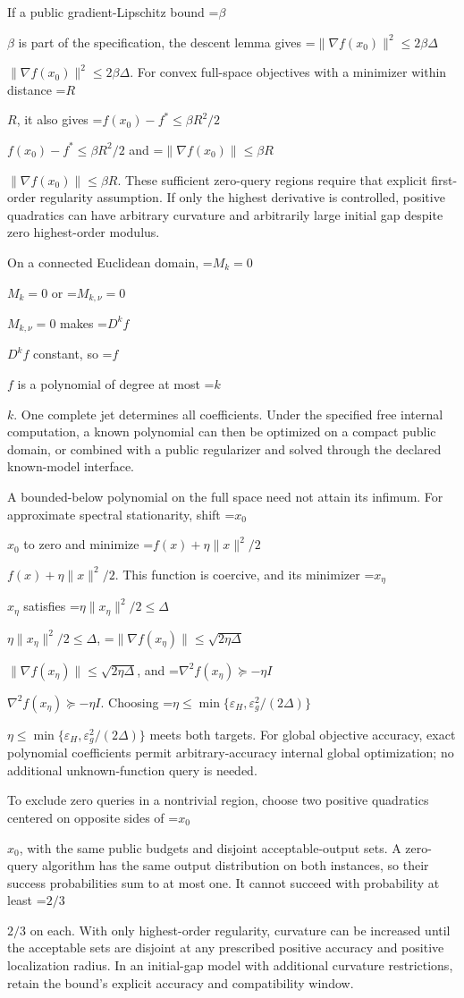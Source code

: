 \documentclass[10pt,a4paper]{article}
\newcommand{\AtlasMath}[1]{\par\begingroup\centering\setbox0=\hbox{$\displaystyle #1$}\ifdim\wd0>1.4\linewidth\typeout{ATLAS WIDE FORMULA: \the\wd0}\fi\ifdim\wd0>\linewidth\resizebox{\linewidth}{!}{\box0}\else\box0\fi\par\endgroup}
\newcommand{\AtlasInlineMath}[1]{\begingroup\setbox0=\hbox{$#1$}\ifdim\wd0>.4\linewidth\endgroup\AtlasMath{#1}\else\endgroup$#1$\fi}
\begin{document}
If a public gradient-Lipschitz bound \AtlasInlineMath{\beta} is part of the specification, the descent lemma gives \AtlasInlineMath{\|\nabla f(x_0)\|^2\le2\beta\Delta}. For convex full-space objectives with a minimizer within distance \AtlasInlineMath{R}, it also gives \AtlasInlineMath{f(x_0)-f^*\le\beta R^2/2} and \AtlasInlineMath{\|\nabla f(x_0)\|\le\beta R}. These sufficient zero-query regions require that explicit first-order regularity assumption. If only the highest derivative is controlled, positive quadratics can have arbitrary curvature and arbitrarily large initial gap despite zero highest-order modulus.

On a connected Euclidean domain, \AtlasInlineMath{M_k=0} or \AtlasInlineMath{M_{k,\nu}=0} makes \AtlasInlineMath{D^kf} constant, so \AtlasInlineMath{f} is a polynomial of degree at most \AtlasInlineMath{k}. One complete jet determines all coefficients. Under the specified free internal computation, a known polynomial can then be optimized on a compact public domain, or combined with a public regularizer and solved through the declared known-model interface.

A bounded-below polynomial on the full space need not attain its infimum. For approximate spectral stationarity, shift \AtlasInlineMath{x_0} to zero and minimize \AtlasInlineMath{f(x)+\eta\|x\|^2/2}. This function is coercive, and its minimizer \AtlasInlineMath{x_\eta} satisfies \AtlasInlineMath{\eta\|x_\eta\|^2/2\le\Delta}, \AtlasInlineMath{\|\nabla f(x_\eta)\|\le\sqrt{2\eta\Delta}}, and \AtlasInlineMath{\nabla^2f(x_\eta)\succeq-\eta I}. Choosing \AtlasInlineMath{\eta\le\min\{\varepsilon_H,\varepsilon_g^2/(2\Delta)\}} meets both targets. For global objective accuracy, exact polynomial coefficients permit arbitrary-accuracy internal global optimization; no additional unknown-function query is needed.

To exclude zero queries in a nontrivial region, choose two positive quadratics centered on opposite sides of \AtlasInlineMath{x_0}, with the same public budgets and disjoint acceptable-output sets. A zero-query algorithm has the same output distribution on both instances, so their success probabilities sum to at most one. It cannot succeed with probability at least \AtlasInlineMath{2/3} on each. With only highest-order regularity, curvature can be increased until the acceptable sets are disjoint at any prescribed positive accuracy and positive localization radius. In an initial-gap model with additional curvature restrictions, retain the bound's explicit accuracy and compatibility window.
\end{document}

